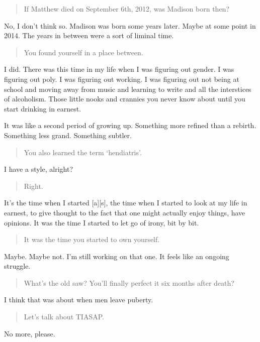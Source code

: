 \begin{quote}
If Matthew died on September 6th, 2012, was Madison born then?
\end{quote}

No, I don't think so. Madison was born some years later. Maybe at some point in 2014. The years in between were a sort of liminal time.

\begin{quote}
You found yourself in a place between.
\end{quote}

I did. There was this time in my life when I was figuring out gender. I was figuring out poly. I was figuring out working. I was figuring out not being at school and moving away from music and learning to write and all the interstices of alcoholism. Those little nooks and crannies you never know about until you start drinking in earnest.

It was like a second period of growing up. Something more refined than a rebirth. Something less grand. Something subtler.

\begin{quote}
You also learned the term `hendiatris'.
\end{quote}

I have a style, alright?

\begin{quote}
Right.
\end{quote}

It's the time when I started {[}a{]}{[}s{]}, the time when I started to look at my life in earnest, to give thought to the fact that one might actually enjoy things, have opinions. It was the time I started to let go of irony, bit by bit.

\begin{quote}
It was the time you started to own yourself.
\end{quote}

Maybe. Maybe not. I'm still working on that one. It feels like an ongoing struggle.

\begin{quote}
What's the old saw? You'll finally perfect it six months after death?
\end{quote}

I think that was about when men leave puberty.

\begin{quote}
Let's talk about TIASAP.
\end{quote}

No more, please.

